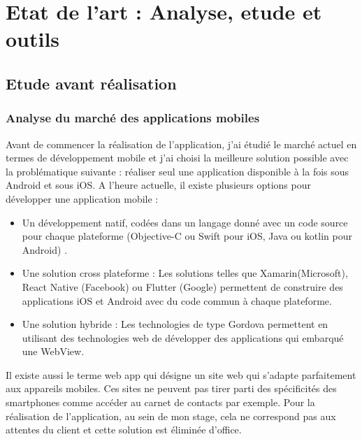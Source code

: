 \chapter{Etat de l'art : Analyse, etude et outils}
\label{sec:Etat de l'art}

\section{Etude avant réalisation}


\subsection{Analyse du marché des applications mobiles}
Avant de commencer la réalisation de l'application, j'ai étudié le marché actuel en termes de développement mobile et j'ai choisi la meilleure solution possible avec la problématique suivante : réaliser seul une application disponible à la fois sous Android et sous iOS. A l’heure actuelle, il existe plusieurs options pour développer une application mobile :

\begin{itemize}
    \item Un développement natif, codées dans un langage donné avec un code source pour chaque plateforme (Objective-C ou Swift pour iOS, Java ou kotlin pour Android) .
    
    \item  Une solution cross plateforme : Les solutions telles que Xamarin(Microsoft), React Native (Facebook) ou Flutter (Google) permettent de construire des applications iOS et Android avec du code commun à chaque plateforme.  
    
    \item Une solution hybride : Les technologies de type Gordova permettent en utilisant des technologies web de développer des applications qui embarqué une WebView.

\end{itemize}

Il existe aussi le terme web app qui désigne un site web qui s'adapte parfaitement aux appareils mobiles. Ces sites ne peuvent pas tirer parti des spécificités des smartphones comme accéder au carnet de contacts par exemple. Pour la réalisation de l'application, au sein de mon stage, cela ne correspond pas aux attentes du client et cette solution est éliminée d'office.

